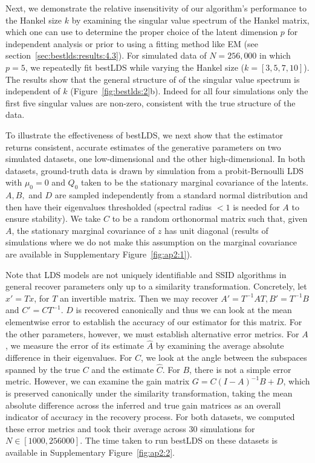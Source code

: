 Next, we demonstrate the relative insensitivity of our algorithm's performance to the Hankel size $k$ by examining the singular value spectrum of the Hankel matrix, which one can use to determine the proper choice of the latent dimension $p$ for independent analysis or prior to using a fitting method like EM (see section~\ref{sec:bestlds:results:4.3}). For simulated data of $N=256,000$ in which $p=5$, we repeatedly fit bestLDS while varying the Hankel size ($k=[3,5,7,10]$). The results show that the general structure of of the singular value spectrum is independent of $k$ (Figure~\ref{fig:bestlds:2}b). Indeed for all four simulations only the first five singular values are non-zero, consistent with the true structure of the data.  

To illustrate the effectiveness of bestLDS, we next show that the estimator returns consistent, accurate estimates of the generative parameters on two simulated datasets, one low-dimensional and the other high-dimensional. In both datasets, ground-truth data is drawn by simulation from a probit-Bernoulli LDS with $\mu_0=0$ and $Q_0$ taken to be the stationary marginal covariance of the latents. $A, B, $ and $D$ are sampled independently from a standard normal distribution and then have their eigenvalues thresholded (spectral radius $<1$ is needed for $A$ to ensure stability). We take $C$ to be a random orthonormal matrix such that, given $A$, the stationary marginal covariance of $z$ has unit diagonal (results of simulations where we do not make this assumption on the marginal covariance are available in Supplementary Figure~\ref{fig:ap2:1}). 

Note that LDS models are not uniquely identifiable and SSID algorithms in general recover parameters only up to a similarity transformation. Concretely, let $x' = Tx$, for $T$ an invertible matrix. Then we may recover $A' = T^{-1}AT, B' = T^{-1}B$ and $C' = CT^{-1}$. $D$ is recovered canonically and thus we can look at the mean elementwise error to establish the accuracy of our estimator for this matrix. For the other parameters, however, we must establish alternative error metrics. For $A$, we measure the error of its estimate $\hat{A}$ by examining the average absolute difference in their eigenvalues. For $C$, we look at the angle between the subspaces spanned by the true $C$ and the estimate $\hat{C}$. For $B$, there is not a simple error metric.  However, we can examine the gain matrix $G = C(I-A)^{-1}B + D$, which is preserved canonically under the similarity transformation, taking the mean absolute difference across the inferred and true gain matrices as an overall indicator of accuracy in the recovery process. For both datasets, we computed these error metrics and took their average across $30$ simulations for $N \in [1000, 256000]$. The time taken to run bestLDS on these datasets is available in Supplementary Figure~\ref{fig:ap2:2}.

